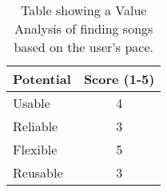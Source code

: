 \begin{table}[h]\label{tab:valueAnalysis}
\begin{tabular}{|l|c|}
\hline
{\textbf{Potential}} & \multicolumn{1}{l|}{{\textbf {Score (1-5)}}} \\ \hline
Usable          & 4                                      \\ \hline
Reliable        & 3                                      \\ \hline
Flexible        & 5                                      \\ \hline
Reusable        & 3                                      \\ \hline
\end{tabular}
\caption{Table showing a Value Analysis of finding songs based on the user's pace.}
\end{table}